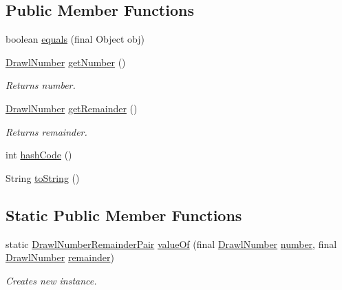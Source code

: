 \subsection*{Public Member Functions}
\begin{DoxyCompactItemize}
\item 
boolean \hyperlink{classcom_1_1aarrelaakso_1_1drawl_1_1_drawl_number_remainder_pair_a8f64c3bb4f744e869d5021db87c577fd}{equals} (final Object obj)
\item 
\hyperlink{classcom_1_1aarrelaakso_1_1drawl_1_1_drawl_number}{Drawl\+Number} \hyperlink{classcom_1_1aarrelaakso_1_1drawl_1_1_drawl_number_remainder_pair_a0924839905a2c81b8bd4b2fd749e9783}{get\+Number} ()
\begin{DoxyCompactList}\small\item\em Returns number. \end{DoxyCompactList}\item 
\hyperlink{classcom_1_1aarrelaakso_1_1drawl_1_1_drawl_number}{Drawl\+Number} \hyperlink{classcom_1_1aarrelaakso_1_1drawl_1_1_drawl_number_remainder_pair_a1d30d70c9111a226e4dbf599139c7096}{get\+Remainder} ()
\begin{DoxyCompactList}\small\item\em Returns remainder. \end{DoxyCompactList}\item 
int \hyperlink{classcom_1_1aarrelaakso_1_1drawl_1_1_drawl_number_remainder_pair_aa56a76d72bd049756ea037819a8163fa}{hash\+Code} ()
\item 
String \hyperlink{classcom_1_1aarrelaakso_1_1drawl_1_1_drawl_number_remainder_pair_a4e2f7077149f0a6f6f4b66bb76a3feb0}{to\+String} ()
\end{DoxyCompactItemize}
\subsection*{Static Public Member Functions}
\begin{DoxyCompactItemize}
\item 
static \hyperlink{classcom_1_1aarrelaakso_1_1drawl_1_1_drawl_number_remainder_pair}{Drawl\+Number\+Remainder\+Pair} \hyperlink{classcom_1_1aarrelaakso_1_1drawl_1_1_drawl_number_remainder_pair_af5db5411a5733a9e2c98aa1e8e88765f}{value\+Of} (final \hyperlink{classcom_1_1aarrelaakso_1_1drawl_1_1_drawl_number}{Drawl\+Number} \hyperlink{classcom_1_1aarrelaakso_1_1drawl_1_1_drawl_number_remainder_pair_a8c62602c155e6b1fe737605fe7229b36}{number}, final \hyperlink{classcom_1_1aarrelaakso_1_1drawl_1_1_drawl_number}{Drawl\+Number} \hyperlink{classcom_1_1aarrelaakso_1_1drawl_1_1_drawl_number_remainder_pair_a95c7e55169d65822bbceb08ff2f800dc}{remainder})
\begin{DoxyCompactList}\small\item\em Creates new instance. \end{DoxyCompactList}\end{DoxyCompactItemize}
